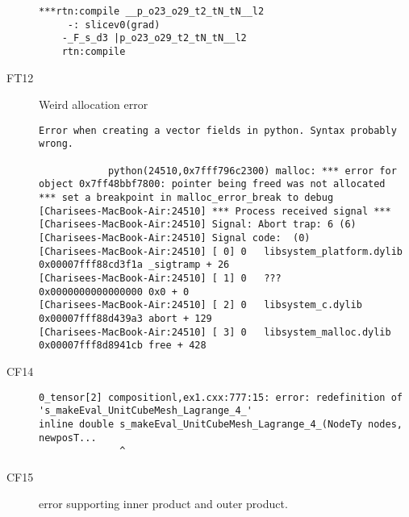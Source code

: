 \begin{description}
\begin{lstlisting}[mathescape=true]
***rtn:compile __p_o23_o29_t2_tN_tN__l2
	 -: slicev0(grad)
	-_F_s_d3 |p_o23_o29_t2_tN_tN__l2
	rtn:compile 
	\end{lstlisting}
\item[FT12]
Weird allocation error\
	    				\begin{lstlisting}[mathescape=true]
    		Error when creating a vector fields in python. Syntax probably wrong.
    		
    		python(24510,0x7fff796c2300) malloc: *** error for object 0x7ff48bbf7800: pointer being freed was not allocated
*** set a breakpoint in malloc_error_break to debug
[Charisees-MacBook-Air:24510] *** Process received signal ***
[Charisees-MacBook-Air:24510] Signal: Abort trap: 6 (6)
[Charisees-MacBook-Air:24510] Signal code:  (0)
[Charisees-MacBook-Air:24510] [ 0] 0   libsystem_platform.dylib            0x00007fff88cd3f1a _sigtramp + 26
[Charisees-MacBook-Air:24510] [ 1] 0   ???                                 0x0000000000000000 0x0 + 0
[Charisees-MacBook-Air:24510] [ 2] 0   libsystem_c.dylib                   0x00007fff88d439a3 abort + 129
[Charisees-MacBook-Air:24510] [ 3] 0   libsystem_malloc.dylib              0x00007fff8d8941cb free + 428
	\end{lstlisting}

	    		\item[CF14]
\begin{lstlisting}[mathescape=true]
	0_tensor[2] compositionl,ex1.cxx:777:15: error: redefinition of 's_makeEval_UnitCubeMesh_Lagrange_4_'
inline double s_makeEval_UnitCubeMesh_Lagrange_4_(NodeTy nodes, newposT...
              ^
	\end{lstlisting}
	
		\item[CF15]
		error supporting inner product and outer product.
\end{description}
